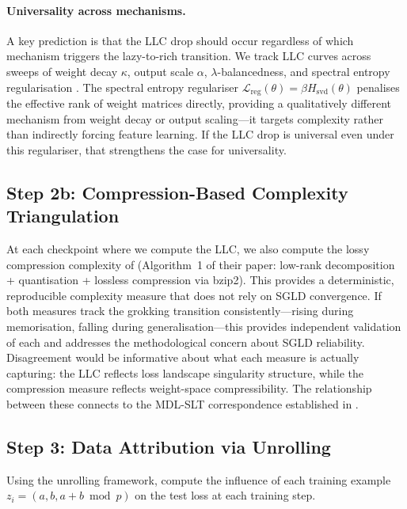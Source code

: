 \documentclass[11pt,a4paper]{article}
\begin{document}
\paragraph{Universality across mechanisms.} A key prediction is that the LLC drop should occur regardless of which mechanism triggers the lazy-to-rich transition. We track LLC curves across sweeps of weight decay $\kappa$, output scale $\alpha$, $\lambda$-balancedness, and spectral entropy regularisation \citep{demoss2025complexity}. The spectral entropy regulariser $\mathcal{L}_{\mathrm{reg}}(\theta) = \beta H_{\mathrm{svd}}(\theta)$ penalises the effective rank of weight matrices directly, providing a qualitatively different mechanism from weight decay or output scaling---it targets complexity rather than indirectly forcing feature learning. If the LLC drop is universal even under this regulariser, that strengthens the case for universality.

\subsection{Step 2b: Compression-Based Complexity Triangulation}\label{sec:triangulation}

At each checkpoint where we compute the LLC, we also compute the lossy compression complexity of \citet{demoss2025complexity} (Algorithm~1 of their paper: low-rank decomposition + quantisation + lossless compression via bzip2). This provides a deterministic, reproducible complexity measure that does not rely on SGLD convergence. If both measures track the grokking transition consistently---rising during memorisation, falling during generalisation---this provides independent validation of each and addresses the methodological concern about SGLD reliability. Disagreement would be informative about what each measure is actually capturing: the LLC reflects loss landscape singularity structure, while the compression measure reflects weight-space compressibility. The relationship between these connects to the MDL-SLT correspondence established in \citet{hoogland2025compressibility}.

\subsection{Step 3: Data Attribution via Unrolling}\label{sec:unrolling}

Using the unrolling framework, compute the influence of each training example $z_i = (a, b, a{+}b \bmod p)$ on the test loss at each training step.
\end{document}
